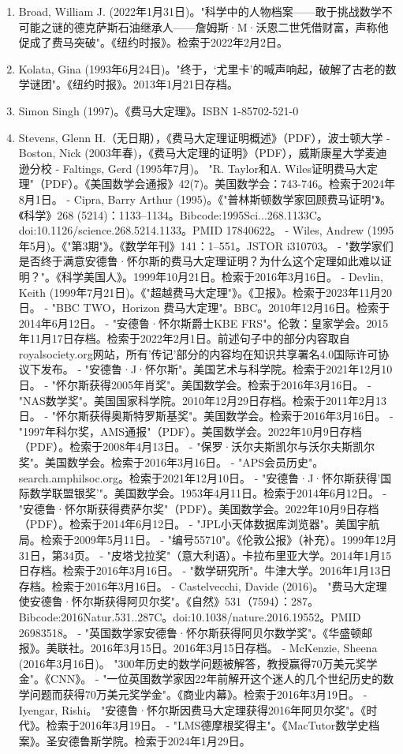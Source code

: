 \begin{enumerate}
\item Broad, William J. (2022年1月31日)。"科学中的人物档案——敢于挑战数学不可能之谜的德克萨斯石油继承人——詹姆斯·M·沃恩二世凭借财富，声称他促成了费马突破"。《纽约时报》。检索于2022年2月2日。  
\item Kolata, Gina (1993年6月24日)。"终于，‘尤里卡’的喊声响起，破解了古老的数学谜团"。《纽约时报》。2013年1月21日存档。  
\item Simon Singh (1997)。《费马大定理》。ISBN 1-85702-521-0  
\item Stevens, Glenn H.（无日期），《费马大定理证明概述》（PDF），波士顿大学
- Boston, Nick (2003年春)，《费马大定理的证明》（PDF），威斯康星大学麦迪逊分校  
- Faltings, Gerd (1995年7月)。 "R. Taylor和A. Wiles证明费马大定理"（PDF）。《美国数学会通报》42(7)。美国数学会：743-746。检索于2024年8月1日。  
- Cipra, Barry Arthur (1995)。《"普林斯顿数学家回顾费马证明"》。《科学》268 (5214)：1133–1134。Bibcode:1995Sci...268.1133C。doi:10.1126/science.268.5214.1133。PMID 17840622。  
- Wiles, Andrew (1995年5月)。《"第3期"》。《数学年刊》141：1–551。JSTOR i310703。  
- "数学家们是否终于满意安德鲁·怀尔斯的费马大定理证明？为什么这个定理如此难以证明？"。《科学美国人》。1999年10月21日。检索于2016年3月16日。  
- Devlin, Keith (1999年7月21日)。《"超越费马大定理"》。《卫报》。检索于2023年11月20日。  
- "BBC TWO，Horizon 费马大定理"。BBC。2010年12月16日。检索于2014年6月12日。  
- "安德鲁·怀尔斯爵士KBE FRS"。伦敦：皇家学会。2015年11月17日存档。检索于2022年2月1日。前述句子中的部分内容取自royalsociety.org网站，所有'传记'部分的内容均在知识共享署名4.0国际许可协议下发布。  
- "安德鲁·J·怀尔斯"。美国艺术与科学院。检索于2021年12月10日。  
- "怀尔斯获得2005年肖奖"。美国数学会。检索于2016年3月16日。  
- "NAS数学奖"。美国国家科学院。2010年12月29日存档。检索于2011年2月13日。  
- "怀尔斯获得奥斯特罗斯基奖"。美国数学会。检索于2016年3月16日。  
- "1997年科尔奖，AMS通报"（PDF）。美国数学会。2022年10月9日存档（PDF）。检索于2008年4月13日。  
- "保罗·沃尔夫斯凯尔与沃尔夫斯凯尔奖"。美国数学会。检索于2016年3月16日。  
- "APS会员历史"。search.amphilsoc.org。检索于2021年12月10日。  
- "安德鲁·J·怀尔斯获得'国际数学联盟银奖'"。美国数学会。1953年4月11日。检索于2014年6月12日。  
- "安德鲁·怀尔斯获得费萨尔奖"（PDF）。美国数学会。2022年10月9日存档（PDF）。检索于2014年6月12日。  
- "JPL小天体数据库浏览器"。美国宇航局。检索于2009年5月11日。  
- "编号55710"。《伦敦公报》（补充）。1999年12月31日，第34页。  
- "皮塔戈拉奖"（意大利语）。卡拉布里亚大学。2014年1月15日存档。检索于2016年3月16日。  
- "数学研究所"。牛津大学。2016年1月13日存档。检索于2016年3月16日。  
- Castelvecchi, Davide (2016)。 "费马大定理使安德鲁·怀尔斯获得阿贝尔奖"。《自然》531（7594）：287。Bibcode:2016Natur.531..287C。doi:10.1038/nature.2016.19552。PMID 26983518。  
- "英国数学家安德鲁·怀尔斯获得阿贝尔数学奖"。《华盛顿邮报》。美联社。2016年3月15日。2016年3月15日存档。  
- McKenzie, Sheena (2016年3月16日)。 "300年历史的数学问题被解答，教授赢得70万美元奖学金"。《CNN》。  
- "一位英国数学家因22年前解开这个迷人的几个世纪历史的数学问题而获得70万美元奖学金"。《商业内幕》。检索于2016年3月19日。  
- Iyengar, Rishi。 "安德鲁·怀尔斯因费马大定理获得2016年阿贝尔奖"。《时代》。检索于2016年3月19日。  
- "LMS德摩根奖得主"。《MacTutor数学史档案》。圣安德鲁斯学院。检索于2024年1月29日。
\end{enumerate}